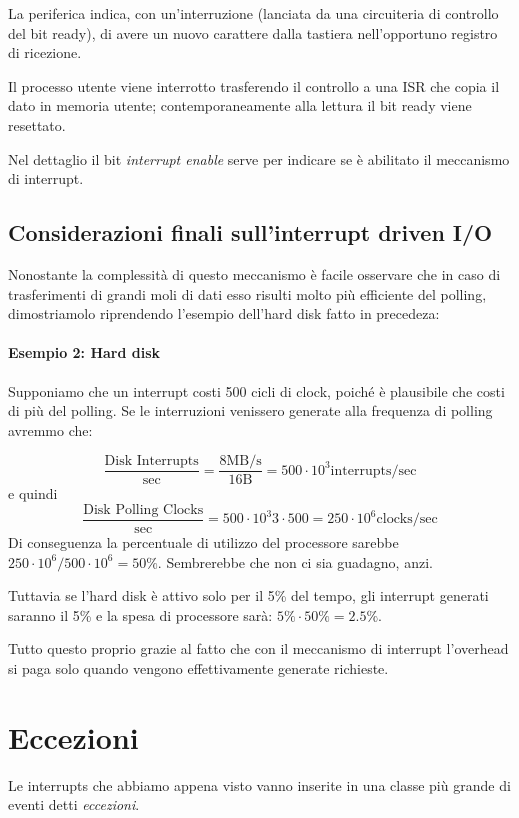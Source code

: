\documentclass[class=book, crop=false, oneside]{standalone}
\begin{document}
La periferica indica, con un'interruzione (lanciata da una circuiteria di controllo del bit ready), di avere un nuovo carattere dalla tastiera nell'opportuno registro di ricezione.

Il processo utente viene interrotto trasferendo il controllo a una ISR che copia il dato in memoria utente; contemporaneamente alla lettura il bit ready viene resettato.

Nel dettaglio il bit \emph{interrupt enable} serve per indicare se è abilitato il meccanismo di interrupt.

\subsection{Considerazioni finali sull'interrupt driven I/O}
Nonostante la complessità di questo meccanismo è facile osservare che in caso di trasferimenti di grandi moli di dati esso risulti  molto più efficiente del polling, dimostriamolo riprendendo l'esempio dell'hard disk fatto in precedeza:

\paragraph{Esempio 2: Hard disk} Supponiamo che un interrupt costi 500 cicli di clock, poiché è plausibile che costi di più del polling. Se le interruzioni venissero generate alla frequenza di polling avremmo che:

\begin{equation*}
	\frac{\textrm{Disk Interrupts}}{\textrm{sec}}=\frac{8 \textrm{MB/s}}{16\textrm{B}}=500\cdot 10^{3}\textrm{interrupts}/\textrm{sec}
\end{equation*}
e quindi
\begin{equation*}
	\frac{\textrm{Disk Polling Clocks}}{\textrm{sec}}=500\cdot 10^3{3}\cdot 500=250\cdot 10^6 \textrm{clocks}/\textrm{sec}
\end{equation*}
Di conseguenza la percentuale di utilizzo del processore sarebbe \(250\cdot 10^6/500\cdot 10^6= 50\%\). Sembrerebbe che non ci sia guadagno, anzi.

Tuttavia se l'hard disk è attivo solo per il 5\% del tempo, gli interrupt generati saranno il 5\% e la spesa di processore sarà: \(5\% \cdot 50\%=2.5\%\).

Tutto questo proprio grazie al fatto che con il meccanismo di interrupt l'overhead si paga solo quando vengono effettivamente generate richieste.

\section{Eccezioni}
Le interrupts che abbiamo appena visto vanno inserite in una classe più grande di eventi detti \emph{eccezioni}.
\end{document}
